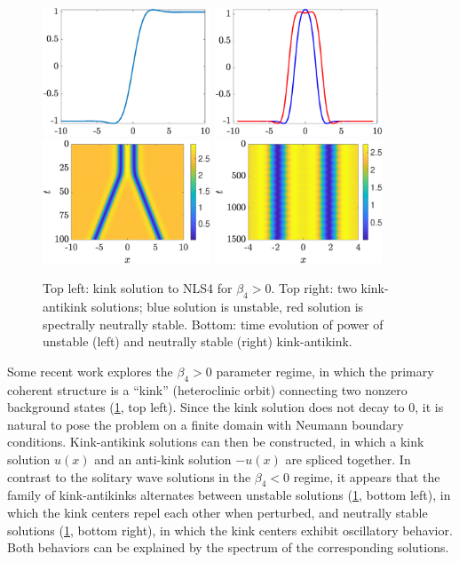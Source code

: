 \documentclass[11pt,reqno,oneside]{article}
\theoremstyle{definition}
\theoremstyle{remark}
\begin{document}
\begin{figure}
    \begin{center}
    \includegraphics[width=5cm]{images/kink}
    \includegraphics[width=5cm]{images/kak}\\
    \includegraphics[width=5cm]{images/kak1colormap}
    \includegraphics[width=5cm]{images/kak2colormap}
    \end{center}
    \caption{Top left: kink solution to NLS4 for $\beta_4>0$. Top right: two kink-antikink solutions; blue solution is unstable, red solution is spectrally neutrally stable. Bottom: time evolution of power of unstable (left) and neutrally stable (right) kink-antikink.}
    \label{fig:NLS4}
\end{figure}

Some recent work explores the $\beta_4 > 0$ parameter regime, in which the primary coherent structure is a ``kink'' (heteroclinic orbit) connecting two nonzero background states (\cref{fig:NLS4}, top left). Since the kink solution does not decay to 0, it is natural to pose the problem on a finite domain with Neumann boundary conditions. Kink-antikink solutions can then be constructed, in which a kink solution $u(x)$ and an anti-kink solution $-u(x)$ are spliced together. In contrast to the solitary wave solutions in the $\beta_4 < 0$ regime, it appears that the family of kink-antikinks alternates between unstable solutions (\cref{fig:NLS4}, bottom left), in which the kink centers repel each other when perturbed, and neutrally stable solutions (\cref{fig:NLS4}, bottom right), in which the kink centers exhibit oscillatory behavior. Both behaviors can be explained by the spectrum of the corresponding solutions. 
\end{document}
